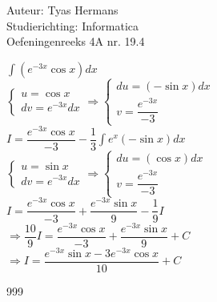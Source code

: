 \documentclass[a4paper]{article}
\begin{document}
  
\noindent \large Auteur: Tyas Hermans \\
\noindent \large Studierichting: Informatica\\
\noindent \large Oefeningenreeks 4A nr. 19.4\\

\medskip

\normalsize

$\displaystyle\int (e^{-3x} \cos x) dx$\\

$
\left\{
\begin{array}{l}
u = \cos x \\
dv = e^{-3x} dx 
\end{array}
\right.
\Rightarrow
\left\{
\begin{array}{l}
du = (-\sin x)dx \\
v = \dfrac{e^{-3x}}{-3}
\end{array}
\right.
$\\

$I = \dfrac{e^{-3x} \cos x}{-3} - \dfrac{1}{3}\displaystyle\int e^x(-\sin x)dx$\\

$
\left\{
\begin{array}{l}
u = \sin x \\
dv = e^{-3x} dx 
\end{array}
\right.
\Rightarrow
\left\{
\begin{array}{l}
du = (\cos x)dx \\
v = \dfrac{e^{-3x}}{-3}
\end{array}
\right.
$\\

$I = \dfrac{e^{-3x} \cos x}{-3}+\dfrac{e^{-3x}\sin x}{9} -\dfrac{1}{9}I$\\

$\Rightarrow \dfrac{10}{9}I =  \dfrac{e^{-3x} \cos x}{-3}+\dfrac{e^{-3x}\sin x}{9} + C$\\

$\Rightarrow I = \dfrac{e^{-3x}\sin x - 3e^{-3x}\cos x}{10} + C$


\begin{thebibliography}{999}
\end{thebibliography}
\end{document}
